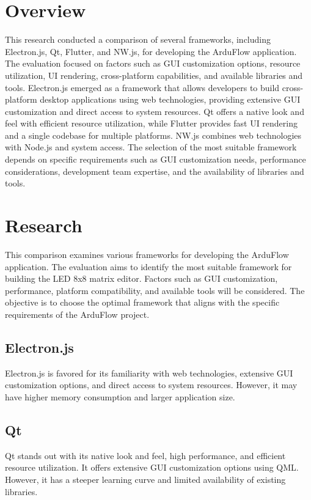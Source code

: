 \documentclass[a4paper, 11pt]{article}
\begin{document}
\section{Overview}
This research conducted a comparison of several frameworks, including Electron.js, Qt, Flutter, and NW.js, for developing the ArduFlow application. The evaluation focused on factors such as GUI customization options, resource utilization, UI rendering, cross-platform capabilities, and available libraries and tools. Electron.js emerged as a framework that allows developers to build cross-platform desktop applications using web technologies, providing extensive GUI customization and direct access to system resources. Qt offers a native look and feel with efficient resource utilization, while Flutter provides fast UI rendering and a single codebase for multiple platforms. NW.js combines web technologies with Node.js and system access. The selection of the most suitable framework depends on specific requirements such as GUI customization needs, performance considerations, development team expertise, and the availability of libraries and tools.

\section{Research}
This comparison examines various frameworks for developing the ArduFlow application. The evaluation aims to identify the most suitable framework for building the LED 8x8 matrix editor. Factors such as GUI customization, performance, platform compatibility, and available tools will be considered. The objective is to choose the optimal framework that aligns with the specific requirements of the ArduFlow project.

\subsection{Electron.js}
Electron.js is favored for its familiarity with web technologies, extensive GUI customization options, and direct access to system resources. However, it may have higher memory consumption and larger application size.

\subsection{Qt}
Qt stands out with its native look and feel, high performance, and efficient resource utilization. It offers extensive GUI customization options using QML. However, it has a steeper learning curve and limited availability of existing libraries.
\end{document}
